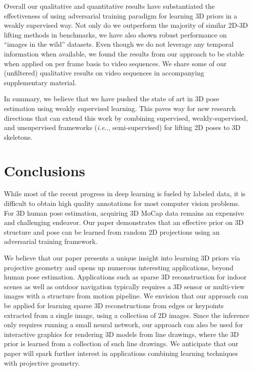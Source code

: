 \documentclass[runningheads]{llncs}
\makeatletter
\DeclareRobustCommand\onedot{\futurelet\@let@token\@onedot}
\def\@onedot{\ifx\@let@token.\else.\null\fi\xspace}
\def\ie{\emph{i.e}\onedot} \def\Ie{\emph{I.e}\onedot}
\makeatother
\begin{document}
Overall our qualitative and quantitative results have substantiated the effectiveness of using adversarial training paradigm for learning 3D priors in a weakly supervised way. Not only do we outperform the majority of similar 2D-3D lifting methods in benchmarks, we have also shown robust performance on ``images in the wild'' datasets. Even though we do not leverage any temporal information when available, we found the results from our approach to be stable when applied on per frame basis to video sequences. We share some of our (unfiltered) qualitative results on video sequences in accompanying supplementary material.

In summary, we believe that we have pushed the state of art in 3D pose estimation using weakly supervised learning. This paves way for new research directions that can extend this work by combining supervised, weakly-supervised, and unsupervised frameworks (\ie, semi-supervised) for lifting 2D poses to 3D skeletons.


\section{Conclusions}\label{sect:conclusions}

While most of the recent progress in deep learning is fueled by labeled data, it is difficult to obtain high quality annotations for most computer vision problems. For 3D human pose estimation, acquiring 3D MoCap data remains an expensive and challenging endeavor. Our paper demonstrates that an effective prior on 3D structure {and pose} can be learned from random 2D projections {using an adversarial training framework}. 

We believe that our paper presents a unique insight into learning 3D priors via projective geometry and opens up numerous interesting applications, beyond human pose estimation. Applications such as sparse 3D reconstruction for indoor scenes as well as outdoor navigation typically requires a 3D sensor or multi-view images with a structure from motion pipeline. We envision that our approach can be applied for learning sparse 3D reconstructions from edges or keypoints extracted from a single image, using a collection of 2D images. Since the inference only requires running a small neural network, our approach can also be used for interactive graphics for rendering 3D models from line drawings, where the 3D prior is learned from a collection of such line drawings. We anticipate that our paper will spark further interest in applications combining learning techniques with projective geometry.
\end{document}

